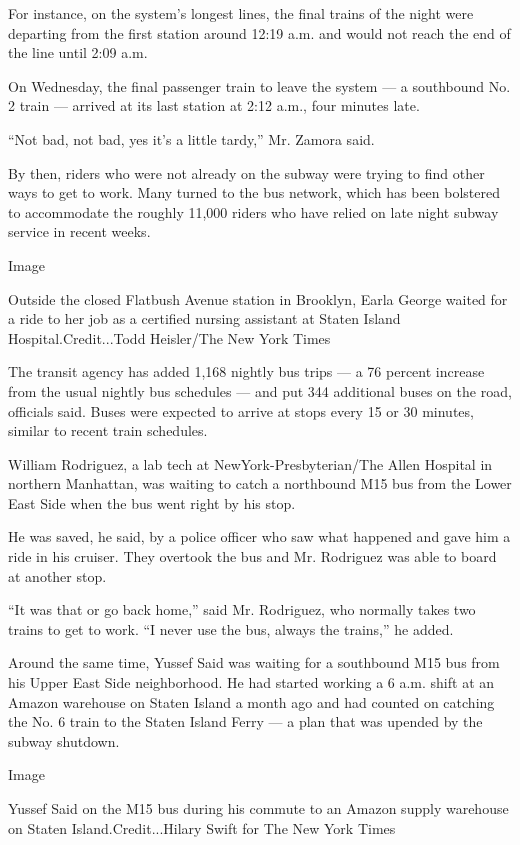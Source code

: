 For instance, on the system's longest lines, the final trains of the
night were departing from the first station around 12:19 a.m. and would
not reach the end of the line until 2:09 a.m.

On Wednesday, the final passenger train to leave the system --- a
southbound No. 2 train --- arrived at its last station at 2:12 a.m.,
four minutes late.

``Not bad, not bad, yes it's a little tardy,'' Mr. Zamora said.

By then, riders who were not already on the subway were trying to find
other ways to get to work. Many turned to the bus network, which has
been bolstered to accommodate the roughly 11,000 riders who have relied
on late night subway service in recent weeks.

Image

Outside the closed Flatbush Avenue station in Brooklyn, Earla George
waited for a ride to her job as a certified nursing assistant at Staten
Island Hospital.Credit...Todd Heisler/The New York Times

The transit agency has added 1,168 nightly bus trips --- a 76 percent
increase from the usual nightly bus schedules --- and put 344 additional
buses on the road, officials said. Buses were expected to arrive at
stops every 15 or 30 minutes, similar to recent train schedules.

William Rodriguez, a lab tech at NewYork-Presbyterian/The Allen Hospital
in northern Manhattan, was waiting to catch a northbound M15 bus from
the Lower East Side when the bus went right by his stop.

He was saved, he said, by a police officer who saw what happened and
gave him a ride in his cruiser. They overtook the bus and Mr. Rodriguez
was able to board at another stop.

``It was that or go back home,'' said Mr. Rodriguez, who normally takes
two trains to get to work. ``I never use the bus, always the trains,''
he added.

Around the same time, Yussef Said was waiting for a southbound M15 bus
from his Upper East Side neighborhood. He had started working a 6 a.m.
shift at an Amazon warehouse on Staten Island a month ago and had
counted on catching the No. 6 train to the Staten Island Ferry --- a
plan that was upended by the subway shutdown.

Image

Yussef Said on the M15 bus during his commute to an Amazon supply
warehouse on Staten Island.Credit...Hilary Swift for The New York Times

